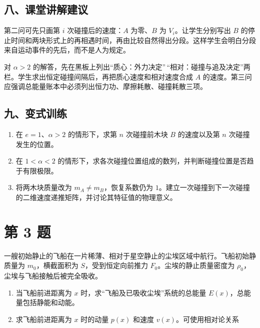 \documentclass[12pt,a4paper,UTF8]{ctexart}
\newcommand{\tightlist}{\setlength{\itemsep}{0pt}\setlength{\parskip}{0pt}}
\begin{document}
\subsection{八、课堂讲解建议}\label{ux516bux8bfeux5802ux8bb2ux89e3ux5efaux8bae-1}

第二问可先只画第 \(i\) 次碰撞后的速度：\(A\) 为零、\(B\) 为
\(V_i\)。让学生分别写出 \(B\)
的停止时间和两块形式上的再相遇时间，再由比较自然得出分段。这样学生会明白分段来自运动事件的先后，而不是人为规定。

对 \(\alpha>2\)
的解答，先在黑板上列出``质心：外力决定''\,``相对：碰撞与追及决定''两栏。学生求出恒定碰撞间隔后，再把质心速度和相对速度合成
\(A\)
的速度。第三问应强调总能量账本中必须列出恒力功、摩擦耗散、碰撞耗散三项。

\subsection{九、变式训练}\label{ux4e5dux53d8ux5f0fux8badux7ec3-1}

\begin{enumerate}
\def\labelenumi{\arabic{enumi}.}
\tightlist
\item
  在 \(e=1\)、\(\alpha>2\) 的情形下，求第 \(n\) 次碰撞前木块 \(B\)
  的速度以及第 \(n\) 次碰撞发生的位置。
\item
  在 \(1<\alpha<2\)
  的情形下，求各次碰撞位置组成的数列，并判断碰撞位置是否趋于有限极限。
\item
  将两木块质量改为 \(m_A\neq m_B\)，恢复系数仍为
  \(1\)。建立一次碰撞到下一次碰撞的二维速度递推矩阵，并讨论其特征值的物理意义。
\end{enumerate}

\newpage

\section{第 3 题}\label{ux7b2c-3-ux9898}

一艘初始静止的飞船在一片稀薄、相对于星空静止的尘埃区域中航行。飞船初始静质量为
\(m_0\)，横截面积为 \(S\)，受到恒定向前推力
\(F_0\)。尘埃的静止质量密度为 \(\rho_0\)，尘埃与飞船接触后被完全吸收。

\begin{enumerate}
\def\labelenumi{\arabic{enumi}.}
\tightlist
\item
  当飞船前进距离为 \(x\) 时，求``飞船及已吸收尘埃''系统的总能量
  \(E(x)\)，总能量包括静能和动能。
\item
  求飞船前进距离为 \(x\) 时的动量 \(p(x)\) 和速度
  \(v(x)\)。可使用相对论关系
\end{enumerate}
\end{document}
